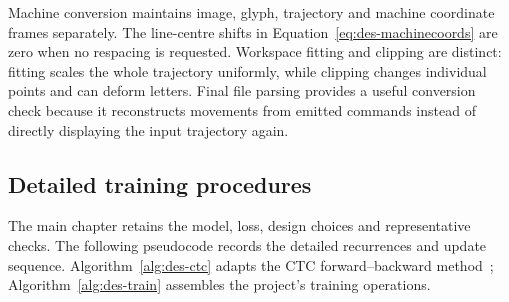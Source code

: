 Machine conversion maintains image, glyph, trajectory and machine coordinate frames separately. The line-centre shifts in Equation~\ref{eq:des-machinecoords} are zero when no respacing is requested. Workspace fitting and clipping are distinct: fitting scales the whole trajectory uniformly, while clipping changes individual points and can deform letters. Final file parsing provides a useful conversion check because it reconstructs movements from emitted commands instead of directly displaying the input trajectory again.
\FloatBarrier

\subsection{Detailed training procedures}\label{app:des-training-procedures}
The main chapter retains the model, loss, design choices and representative checks. The following pseudocode records the detailed recurrences and update sequence. Algorithm~\ref{alg:des-ctc} adapts the CTC forward--backward method~\cite[pp.~4--6]{graves2006}; Algorithm~\ref{alg:des-train} assembles the project's training operations.

\begin{designalgorithm}
\caption{Numerical CTC loss and logit gradient}
\label{alg:des-ctc}
\begin{designpseudo}
\end{designpseudo}
\end{designalgorithm}

